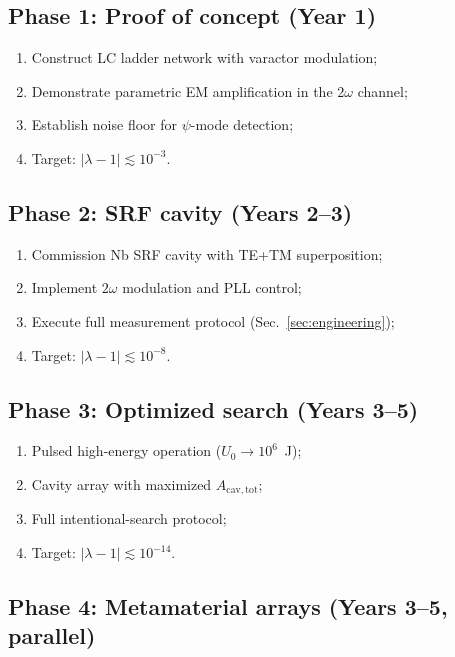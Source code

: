 \documentclass[12pt,aps,prd,twocolumn,superscriptaddress,nofootinbib]{revtex4-2}
\newcommand{\Acav}{A_{\mathrm{cav,tot}}}
\begin{document}
\subsection{Phase 1: Proof of concept (Year 1)}

\begin{enumerate}[noitemsep]
  \item Construct LC ladder network with varactor modulation;
  \item Demonstrate parametric EM amplification in the $2\omega$ channel;
  \item Establish noise floor for $\psi$-mode detection;
  \item Target: $|\lambda - 1| \lesssim 10^{-3}$.
\end{enumerate}

\subsection{Phase 2: SRF cavity (Years 2--3)}

\begin{enumerate}[noitemsep]
  \item Commission Nb SRF cavity with TE+TM superposition;
  \item Implement $2\omega$ modulation and PLL control;
  \item Execute full measurement protocol (Sec.~\ref{sec:engineering});
  \item Target: $|\lambda - 1| \lesssim 10^{-8}$.
\end{enumerate}

\subsection{Phase 3: Optimized search (Years 3--5)}

\begin{enumerate}[noitemsep]
  \item Pulsed high-energy operation ($U_0 \to 10^6$~J);
  \item Cavity array with maximized $\Acav$;
  \item Full intentional-search protocol;
  \item Target: $|\lambda - 1| \lesssim 10^{-14}$.
\end{enumerate}

\subsection{Phase 4: Metamaterial arrays (Years 3--5, parallel)}
\end{document}
